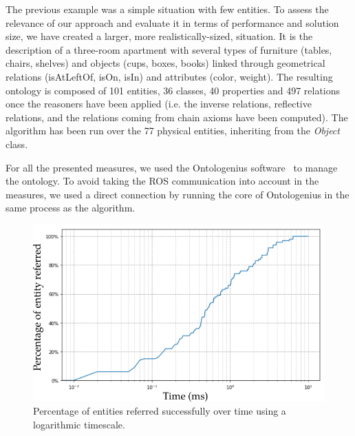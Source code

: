 The previous example was a simple situation with few entities. To assess the relevance of our approach and evaluate it in terms of performance and solution size, we have created a larger, more realistically-sized, situation. It is the description of a three-room apartment with several types of furniture (tables, chairs, shelves) and objects (cups, boxes, books) linked through geometrical relations (isAtLeftOf, isOn, isIn) and attributes (color, weight). The resulting ontology is composed of 101 entities, 36 classes, 40 properties and 497 relations once the reasoners have been applied (i.e. the inverse relations, reflective relations, and the relations coming from chain axioms have been computed). The algorithm has been run over the 77 physical entities, inheriting from the \textit{Object} class.

For all the presented measures, we used the Ontologenius software~\cite{sarthou_2019_ontologenius} to manage the ontology. To avoid taking the ROS communication into account in the measures, we used a direct connection by running the core of Ontologenius in the same process as the algorithm.

\begin{figure}[ht!]
\centering
\includegraphics[scale=0.55]{figures/chapter4/scaling_up_percentage.png}
\caption{\label{fig:chap4_percentage} Percentage of entities referred successfully over time using a logarithmic timescale. }
\end{figure}


